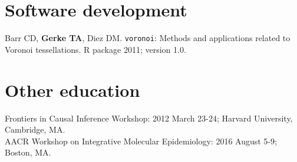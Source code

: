 \documentclass[11pt, a4paper]{article} %
\begin{document}
\section*{Software development}
Barr CD, {\bf Gerke TA}, Diez DM. \verb|voronoi|: Methods and applications related to Voronoi tessellations. R package 2011; version 1.0.

\section*{Other education}
Frontiers in Causal Inference Workshop: 2012 March 23-24; Harvard University, Cambridge, MA.\\

AACR Workshop on Integrative Molecular Epidemiology: 2016 August 5-9; Boston, MA.\\


\end{document}
